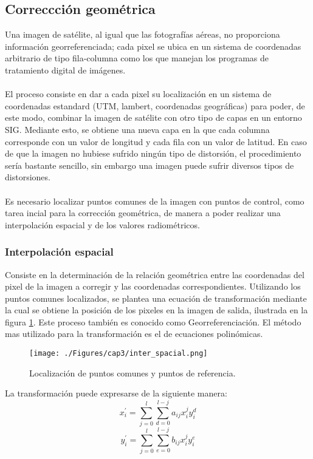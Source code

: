 \subsection{Correccci\'on geom\'etrica}\label{sec:corrGeometrica}
Una imagen de sat\'elite, al igual que las fotograf\'ias a\'ereas, no proporciona informaci\'on georreferenciada; cada pixel se ubica en un sistema de coordenadas arbitrario de tipo fila-columna como los que manejan los programas de tratamiento digital de im\'agenes.\\~\\
El proceso consiste en dar a cada pixel su localizaci\'on en un sistema de coordenadas estandard (UTM, lambert, coordenadas geogr\'aficas) para poder, de este modo, combinar la imagen de sat\'elite con otro tipo de capas en un entorno SIG. Mediante esto, se obtiene una nueva capa en la que cada columna corresponde con un valor de longitud y cada fila con un valor de latitud. En caso de que la imagen no hubiese sufrido ningún tipo de distorsi\'on, el procedimiento ser\'ia bastante sencillo, sin embargo una imagen puede sufrir diversos tipos de distorsiones.\\~\\
Es necesario localizar puntos comunes de la imagen con puntos de control, como tarea incial para la correcci\'on geom\'etrica, de manera a poder realizar una interpolaci\'on espacial y de los valores radiom\'etricos\cite{deniseCultivos}.

\subsubsection{Interpolaci\'on espacial}
Consiste en la determinaci\'on de la relaci\'on geom\'etrica entre las coordenadas del pixel de la imagen a corregir y las coordenadas correspondientes. Utilizando los puntos comunes localizados, se plantea una ecuaci\'on de transformaci\'on mediante la cual se obtiene la posici\'on de los pixeles en la imagen de salida, ilustrada en la figura \ref{fig:intEspacial}. Este proceso tambi\'en es conocido como Georreferenciaci\'on. El m\'etodo mas utilizado para la transformaci\'on es el de ecuaciones polin\'omicas. 
    \begin{figure}[H]
    	\centering
    	\texttt{[image: ./Figures/cap3/inter\_spacial.png]}
    	\caption{Localizaci\'on de puntos comunes y puntos de referencia.}
    	\label{fig:intEspacial}
    \end{figure}
 
 La transformaci\'on puede expresarse de la siguiente manera:
	\begin{equation}
	x^{'}_{i} = \sum_{j=0}^{l} \sum_{d=0}^{l-j} a_{ij}x^{j}_{i}y^{d}_{i}
	\end{equation} 
		\begin{equation}
		y^{'}_{i} = \sum_{j=0}^{l} \sum_{e=0}^{l-j} b_{ij}x^{j}_{i}y^{e}_{i}
		\end{equation} 


